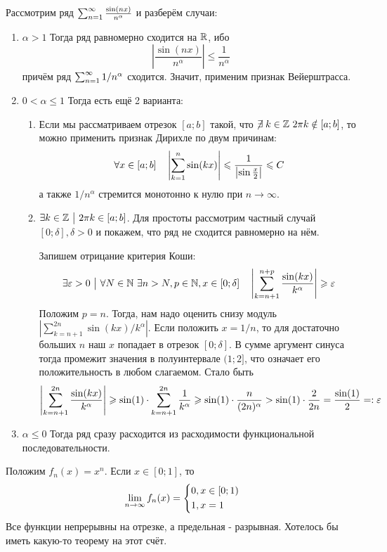 \begin{example}
	Рассмотрим ряд $\sum_{n = 1}^\infty \frac{\sin (nx)}{n^\alpha}$ и разберём случаи:
	\begin{enumerate}
		\item $\alpha > 1$ Тогда ряд равномерно сходится на $\mathbb{R}$, ибо
		\[
			\left|\frac{\sin (nx)}{n^\alpha}\right| \le \frac{1}{n^\alpha}
		\]
		причём ряд $\sum_{n = 1}^\infty 1/n^\alpha$ сходится. Значит, применим признак Вейерштрасса.
		
		\item $0 < \alpha \le 1$ Тогда есть ещё 2 варианта:
		\begin{enumerate}
			\item Если мы рассматриваем отрезок $[a; b]$ такой, что $\centernot\exists k \in \Z\  2\pi k \notin [a; b]$, то можно применить признак Дирихле по двум причинам:
			\[
				\forall x \in [a; b] \quad \left|\sum\limits_{k = 1}^n \sin (kx)\right| \leqslant \frac{1}{\left|\sin \frac{x}{2}\right|} \leqslant C
			\]
			а также $1/n^\alpha$ стремится монотонно к нулю при $n \to \infty$.
			
			\item $\exists k \in \mathbb{Z} \ \big|\  2\pi k \in [a; b]$. Для простоты рассмотрим частный случай $[0; \delta], \delta > 0$ и покажем, что ряд не сходится равномерно на нём.
			
			Запишем отрицание критерия Коши:
			\[
				\exists \varepsilon > 0 \ \big|\  \forall N \in \mathbb{N}\ \exists n > N, p \in \mathbb{N}, x \in [0; \delta] \quad \left|\sum\limits_{k = n + 1}^{n + p} \frac{\sin (kx)}{k^\alpha}\right| \geqslant \varepsilon
			\]
			Положим $p = n$. Тогда, нам надо оценить снизу модуль \(|\sum_{k = n + 1}^{2n} \sin(kx)/k^\alpha|\). Если положить $x = 1/n$, то для достаточно больших $n$ наш $x$ попадает в отрезок $[0; \delta]$. В сумме аргумент синуса тогда промежит значения в полуинтервале $(1; 2]$, что означает его положительность в любом слагаемом. Стало быть
			\[
				\left|\sum\limits_{k = n + 1}^{2n} \frac{\sin (kx)}{k^\alpha}\right| \geqslant \sin (1) \cdot \sum\limits_{k = n + 1}^{2n} \frac{1}{k^\alpha} \geqslant \sin(1) \cdot \frac{n}{(2n)^\alpha} > \sin(1) \cdot \frac{2}{2n} = \frac{\sin(1)}{2} =: \varepsilon
			\]
		\end{enumerate}
	
		\item $\alpha \le 0$ Тогда ряд сразу расходится из расходимости функциональной последовательности.
	\end{enumerate}
\end{example}

\begin{example}
	Положим $f_n(x) = x^n$. Если $x \in [0; 1]$, то
	\[
		\lim\limits_{n \to \infty} f_n(x) = \left\{\begin{aligned}
			&{0, x \in [0; 1)}
			\\
			&{1, x = 1}
		\end{aligned}\right.
	\]
	Все функции непрерывны на отрезке, а предельная - разрывная. Хотелось бы иметь какую-то теорему на этот счёт.
\end{example}

